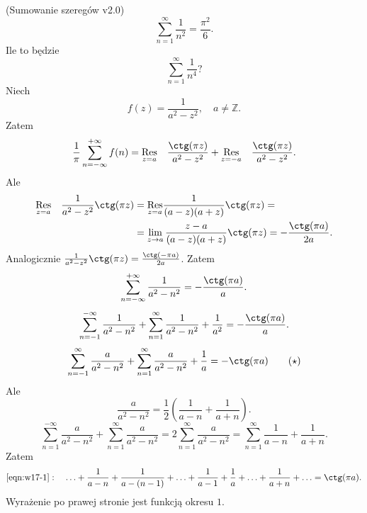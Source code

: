 \documentclass[../main.tex]{subfiles}
\begin{document}
\begin{przyklad}
    (Sumowanie szeregów v2.0)\\
    \[
    \sum_{n=1}^{\infty} \frac{1}{n^2} = \frac{\pi^2}{6}
    .\]
Ile to będzie \[
\sum_{n=1}^{\infty} \frac{1}{n^4}?
\]
    Niech
    \[
        f(z) = \frac{1}{a^2 - z^2},\quad a\neq \mathbb{Z}
    .\]
Zatem
\[
    \frac{1}{\pi}\sum_{n=-\infty}^{+\infty} f(n) = \underset{z = a}{\Res} \quad \frac{\ctg(\pi z)}{a^2 - z^2} + \underset{z = -a}{\Res} \quad \frac{\ctg(\pi z)}{a^2 -z^2}
.\]
Ale
\begin{align*}
    \underset{z = a}{\Res} \quad \frac{1}{a^2 - z^2}\ctg(\pi z) &= \underset{z = a}{\Res} \frac{1}{(a-z)(a+z)} \ctg(\pi z) =\\
    &=\lim\limits_{z\to a} \frac{z-a}{(a-z)(a+z)}\ctg(\pi z) = -\frac{\ctg(\pi a)}{2a}
.\end{align*}
Analogicznie $\frac{1}{a^2 - z^2}\ctg(\pi z) = \frac{\ctg(-\pi a)}{2a}$. Zatem
\[
    \sum_{n=-\infty}^{+\infty} \frac{1}{a^2-n^2} = - \frac{\ctg(\pi a)}{a}
.\]
\[
    \sum_{n=-1}^{-\infty} \frac{1}{a^2 - n^2} + \sum_{n=1}^{\infty} \frac{1}{a^2 - n^2} + \frac{1}{a^2} = - \frac{\ctg(\pi a)}{a}
.\]
\begin{equation}
    \label{eqn:w17-1}
    \sum_{n=-1}^{\infty} \frac{a}{a^2 - n^2} + \sum_{n=1}^{\infty} \frac{a}{a^2 - n^2} + \frac{1}{a} = -\ctg(\pi a)\tag{$\star$}
\end{equation}
Ale
\[
    \frac{a}{a^2 - n^2} = \frac{1}{2}\left( \frac{1}{a-n} + \frac{1}{a+n} \right)
.\]
\[
    \sum_{n=1}^{-\infty} \frac{a}{a^2 - n^2} + \sum_{n=1}^{\infty} \frac{a}{a^2 - n^2} = 2 \sum_{n=1}^{\infty} \frac{a}{a^2 - n^2} = \sum_{n=1}^{\infty} \frac{1}{a-n} + \frac{1}{a+n}
.\]
Zatem
\[
    \eqref{eqn:w17-1}:\quad \ldots + \frac{1}{a-n} + \frac{1}{a-(n-1)} + \ldots + \frac{1}{a-1} + \frac{1}{a} + \ldots + \frac{1}{a+n} + \ldots = \ctg(\pi a)
.\]
Wyrażenie po prawej stronie jest funkcją okresu $1$.
\end{przyklad}
\end{document}
